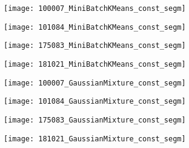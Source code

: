 \begin{figure}[!ht]
    
    \begin{subfigure}[t]{\textwidth+20pt\relax}
    	\centering
    	\texttt{[image: 100007\_MiniBatchKMeans\_const\_segm]} 
    \end{subfigure}      
    \begin{subfigure}[b]{0.23\textwidth}
    	\centering
        \texttt{[image: 101084\_MiniBatchKMeans\_const\_segm]}
    \end{subfigure}
    \begin{subfigure}[b]{0.23\textwidth}
    	\centering
        \texttt{[image: 175083\_MiniBatchKMeans\_const\_segm]}
    \end{subfigure}
    \begin{subfigure}[b]{0.23\textwidth}
    	\centering
        \texttt{[image: 181021\_MiniBatchKMeans\_const\_segm]}
    \end{subfigure} \vspace{5pt}
    
    
    \begin{subfigure}[t]{\textwidth+20pt\relax}
    	\centering
    	\texttt{[image: 100007\_GaussianMixture\_const\_segm]} 
    \end{subfigure}      
    \begin{subfigure}[b]{0.23\textwidth}
    	\centering
        \texttt{[image: 101084\_GaussianMixture\_const\_segm]}
    \end{subfigure}
    \begin{subfigure}[b]{0.23\textwidth}
    	\centering
        \texttt{[image: 175083\_GaussianMixture\_const\_segm]}
    \end{subfigure}
    \begin{subfigure}[b]{0.23\textwidth}
    	\centering
        \texttt{[image: 181021\_GaussianMixture\_const\_segm]}
    \end{subfigure} \vspace{5pt}
    

\end{figure}
